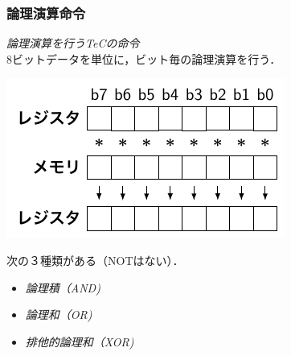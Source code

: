 \documentclass[handout]{beamer}        %
\begin{document}
\begin{frame}
\begin{tabular}{l l}
  \end{tabular}
  \vfill
\end{frame}

\begin{frame}
  \frametitle{論理演算命令}
  \emph{論理演算を行うTeCの命令} \\
  8ビットデータを単位に，ビット毎の論理演算を行う． \\
  \centerline{\includegraphics[scale=0.8]{../Tikz/land.pdf}}
  \vfill
  次の３種類がある（NOTはない）．
  \begin{itemize}
  \item \emph{論理積（AND)}
  \item \emph{論理和（OR)}
  \item \emph{排他的論理和（XOR)}
  \end{itemize}
  \vfill
\end{frame}
\end{document}
